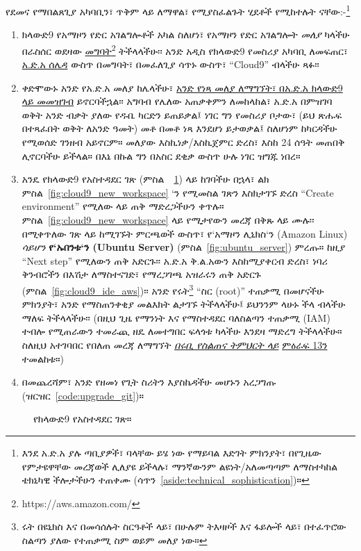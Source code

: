 የደመና የማበልጸጊያ አካባቢን፣ ጥቅም ላይ ለማዋል፣ የሚያስፈልጉት ሂደቶች የሚከተሉት ናቸው:-\footnote{እንደ አ.ድ.አ ያሉ ጣቢያዎች፣ ባላቸው ይሄ ነው የማይባል እድገት ምክንያት፣ በየጊዜው የምታዩዋቸው መረጃወች ሊለያዩ ይችላሉ፣ ማንኛውንም ልዩነት/አለመጣጣም ለማስተካከል ቴክኒካዊ ችሎታችሁን ተጠቀሙ (ሳጥን~\ref{aside:technical_sophistication})።}
\begin{enumerate}
\item ክላውድ9 የአማዞን የድር አገልግሎቶች አካል ስለሆነ፣ የአማዞን የድር አገልግሎት \emph{መለያ} ካላችሁ በራስሰር ወደዛው \href{https://aws.amazon.com/}{መግባት}\footnote{https://aws.amazon.com/} ትችላላችሁ፡፡ አንድ አዲስ የክላውድ9 የመስሪያ አካባቢ ለመፍጠር፣ \href{https://console.aws.amazon.com/}{አ.ድ.አ ሰሌዳ} ውስጥ በመግባት፣ በመፈለጊያ ሳጥኑ ውስጥ፣ ``Cloud9'' ብላችሁ ጻፉ፡፡
\item ቀድሞውኑ አንድ የአ.ድ.አ መለያ ከሌላችሁ፣ \href{https://www.railstutorial.org/cloud9-signup}{አንድ የነጻ መለያ ለማግኘት፣ በአ.ድ.አ ክላውድ9 ላይ መመዝገብ} ይኖርባችኋል፡፡ አግባብ የሌለው አጠቃቀምን ለመከላከል፣ አ.ድ.አ በምዝገባ ወቅት አንድ ብቃት ያለው የዱቤ ካርድን ይጠይቃል፤ ነገር ግን የመስሪያ ቦታው፣ (ይህ ጽሑፍ በተጻፈበት ወቅት ለአንድ ዓመት) መቶ በመቶ ነጻ እንደሆነ ይታወቃል፤ ስለሆነም ከካርዳችሁ የሚወሰድ ገንዘብ አይኖርም። መለያው እስኪነቃ/እስኪጀምር ድረስ፣ እስከ 24 ሰዓት መጠበቅ ሊኖርባችሁ ይችላል። በእኔ በኩል ግን በአስር ደቂቃ ውስጥ ሁሉ ነገር ዝግጁ ነበረ።
\item አንዴ የክላውድ9 የአስተዳደር ገጽ (ምስል~~\ref{fig:cloud9_page_aws}) ላይ ከገባችሁ በኋላ፣ ልክ ምስል~\ref{fig:cloud9_new_workspace} `ን የሚመስል ገጽን እስክታገኙ ድረስ ``Create environment'' የሚለው ላይ ጠቅ ማድረጋችሁን ቀጥሉ። ምስል~\ref{fig:cloud9_new_workspace} ላይ የሚታየውን መረጃ በቅጹ ላይ ሙሉ፡፡ በሚቀጥለው ገጽ ላይ ከሚገኙት ምርጫወች ውስጥ፣ የ`አማዞን ሊኒክስ`ን (Amazon Linux) \emph{ሳይሆን} \textbf{የ`ኡበንቱ`ን (Ubuntu Server)} (ምስል~\ref{fig:ubuntu_server}) ምረጡ። ከዚያ ``Next step'' የሚለውን ጠቅ አድርጉ፡፡ አ.ድ.አ ቅ.ል.አውን እስከሚያቀርብ ድረስ፣ ነባሪ ቅንብሮችን በእሽታ ለማስተናገድ፣ የማረጋገጫ አዝራሩን ጠቅ አድርጉ (ምስል~\ref{fig:cloud9_ide_aws})፡፡ አንድ የሩት\footnote{ሩት በዩኒክስ እና በመሳሰሉት ስርዓቶች ላይ፣ በሁሉም ትእዛዞች እና ፋይሎች ላይ፣ በተፈጥሮው ስልጣን ያለው የተጠቃሚ ስም ወይም መለያ ነው።} ``ስር (root)'' ተጠቃሚ በመሆናችሁ ምክንያት፣ አንድ የማስጠንቀቂያ መልእክት ልታገኙ ትችላላችሁ፤ ይህንንም ላሁኑ ችላ ብላችሁ ማለፍ ትችላላችሁ፡፡ (በዚህ ጊዜ የማንነት እና የማስተዳደር ባለስልጣን ተጠቃሚ (IAM) ተብሎ የሚጠራውን ተመራጪ ዘዴ ለመተግበር ፍላጎቱ ካላችሁ እንደዛ ማድረግ ትችላላችሁ። ስለዚህ አተገባበር የበለጠ መረጃ ለማግኘት \href{https://www.railstutorial.org/}{\emph{በሩቢ የስልጠና ትምህርት ላይ}} \href{https://www.railstutorial.org/book/user_microposts#sec-image_upload_in_production}{ምዕራፍ 13ን} ተመልከቱ።)
\item በመጨረሻም፣ አንድ የዘመነ የጊት ስሪትን እያስኬዳችሁ መሆኑን አረጋግጡ (ዝርዝር~\ref{code:upgrade_git})።
\end{enumerate}

\begin{figure}
\begin{center}
\end{center}
\caption{የክላውድ9 የአስተዳደር ገጽ።\label{fig:cloud9_page_aws}}
\end{figure}

